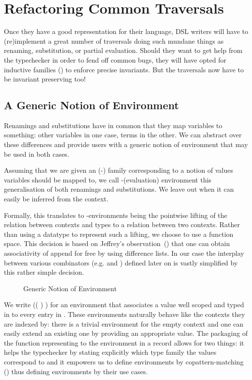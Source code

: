 \chapter{Refactoring Common Traversals}

Once they have a good representation for their language, DSL writers will have
to (re)implement a great number of traversals doing such mundane things as
renaming, substitution, or partial evaluation. Should they want to get help
from the typechecker in order to fend off common bugs, they will have opted
for inductive families (\cite{dybjer1991inductive}) to enforce precise
invariants. But the traversals now have to be invariant preserving too!

\section{A Generic Notion of Environment}
\label{sec:genenvironment}

Renamings and substitutions have in common that they map variables
to something: other variables in one case, terms in the other. We
can abstract over these differences and provide users with a generic
notion of environment that may be used in both cases.

Assuming that we are given an (-) family 
corresponding to a notion of values variables should be mapped to,
we call -(evaluation) environment this generalisation of both
renamings and substitutions. We leave out  when it can easily
be inferred from the context.

Formally, this translates to -environments being the pointwise
lifting of the relation  between contexts and types to a relation
between two contexts. Rather than using a datatype to represent such a
lifting, we choose to use a function space.
%
This decision is based on Jeffrey's observation~(\citeyear{jeffrey2011assoc})
that one can obtain associativity of append for free by using difference lists.
In our case the interplay between various combinators (e.g.  and
) defined later on is vastly simplified by this rather simple
decision.

\begin{figure}[h]
\caption{Generic Notion of Environment\label{fig:env}}
\end{figure}

We write {(( )  )} for an environment that
associates a value  well scoped and typed in  to every
entry in .
%
These environments naturally behave like the contexts they are indexed by:
there is a trivial environment for the empty context and one can easily
extend an existing one by providing an appropriate value. The packaging of
the function representing to the environment in a record allows for two
things: it helps the typechecker by stating explicitly which type family
the values correspond to and it empowers us to define environments by
copattern-matching (\cite{abel2013copatterns}) thus defining environments
by their use cases.

